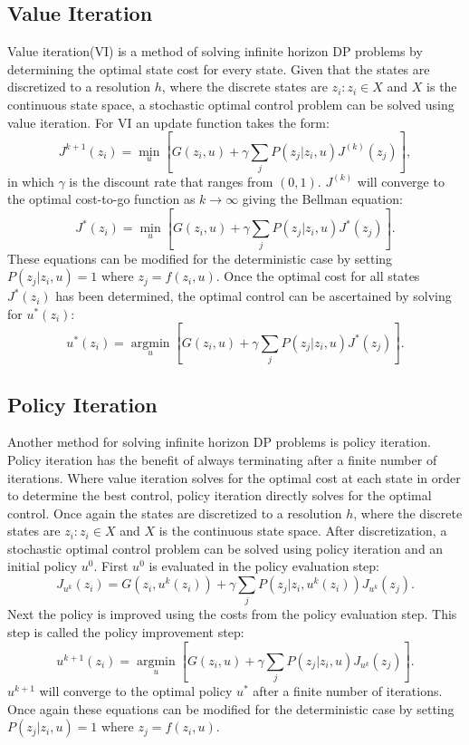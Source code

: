 \subsection{Value Iteration}
Value iteration(VI) is a method of solving infinite horizon DP problems by determining the optimal state cost for every state. Given that the states are discretized to a resolution $h$, where the discrete states are ${z_i:z_i \in X}$ and $X$ is the continuous state space, a stochastic optimal control problem can be solved using value iteration. For VI an update function takes the form:
\begin{equation}\label{dpvi}
J^{k+1}(z_i)= \underset{u }{\operatorname{min }}[G(z_i,u) + \gamma \sum_{j}P(z_j|z_i, u)J^{(k)}(z_j)],
\end{equation}
in which $\gamma$ is the discount rate that ranges from $(0,1)$. $J^{(k)}$ will converge to the optimal cost-to-go function as $k \rightarrow \infty$ giving the Bellman equation:
\begin{equation*}
J^*(z_i) = \underset{u }{\operatorname{min }}[G(z_i,u) + \gamma \sum_{j}P(z_j|z_i,u)J^*(z_j)].
\end{equation*}
These equations can be modified for the deterministic case by setting $P(z_j|z_i, u)=1$ where $z_j = f(z_i,u)$. Once the optimal cost for all states $J^*(z_i)$ has been determined, the optimal control can be ascertained by solving for $u^*(z_i)$:
\begin{equation}\label{udpvi}
u^*(z_i) = \underset{u }{\operatorname{arg min }}[G(z_i,u) + \gamma \sum_{j}P(z_j|z_i,u)J^*(z_j)].
\end{equation}      

\subsection{Policy Iteration}
Another method for solving infinite horizon DP problems is policy iteration. Policy iteration has the benefit of always terminating after a finite number of iterations. Where value iteration solves for the optimal cost at each state in order to determine the best control, policy iteration directly solves for the optimal control. Once again the states are discretized to a resolution $h$, where the discrete states are ${z_i:z_i \in X}$ and $X$ is the continuous state space. After discretization, a stochastic optimal control problem can be solved using policy iteration and an initial policy $u^0$. First $u^0$ is evaluated in the policy evaluation step:
\begin{equation}\label{dppi}
J_{u^k}(z_i)= G(z_i,u^k(z_i)) + \gamma \sum_{j}P(z_j|z_i, u^k(z_i))J_{u^k}(z_j).
\end{equation}
Next the policy is improved using the costs from the policy evaluation step. This step is called the policy improvement step:
\begin{equation}\label{udppi}
u^{k+1}(z_i) = \underset{u }{\operatorname{arg min }}[G(z_i,u) + \gamma \sum_{j}P(z_j|z_i,u)J_{u^k}(z_j)].
\end{equation} 
$u^{k+1}$ will converge to the optimal policy $u^*$ after a finite number of iterations. Once again these equations can be modified for the deterministic case by setting $P(z_j|z_i, u)=1$ where $z_j = f(z_i,u)$.\cite{bert} 